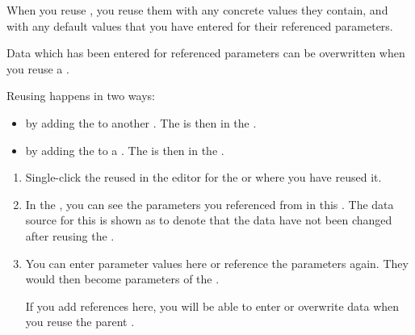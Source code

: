 
When you reuse \gdcases{}, you reuse them with any concrete values they contain, and with any default values that you have entered for their referenced parameters.  

Data which has been entered for referenced parameters can be overwritten when you reuse a \gdcase{}.

Reusing \gdcases{} happens in two ways:
\begin{itemize}
\item by adding the \gdcase{} to another \gdcase{} . The \gdcase{} is then  in the \gdcase{}. 
\item by adding the \gdcase{} to a \gdsuite{} . The \gdcase{} is then  in the \gdsuite{}. 
\end{itemize}

\begin{enumerate}
\item Single-click the reused \gdcase{} in the editor for the \gdcase{} or \gdsuite{} where you have reused it. 

\item In the \gdpropview{}, you can see the parameters you referenced from in this \gdcase{}. The data source for this \gdcase{} is shown as  to denote that the data have not been changed after reusing the \gdcase{}. 


\item You can enter parameter values here or reference the parameters again. They would then become parameters of the  \gdcase{}.


If you add references here, you will be able to enter or overwrite data when you reuse the parent \gdcase{}. 

\end{enumerate}


